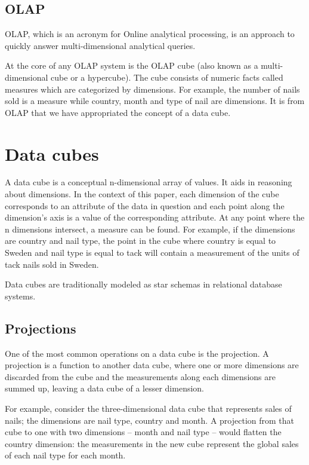 \subsection{OLAP}

OLAP, which is an acronym for Online analytical processing, is an approach to
quickly answer multi-dimensional analytical queries.

At the core of any OLAP system is the OLAP cube (also known as a
multi-dimensional cube or a hypercube). The cube consists of numeric facts
called measures which are categorized by dimensions. For example, the number
of nails sold is a measure while country, month and type of nail are
dimensions. It is from OLAP that we have appropriated the concept of a data
cube.


\section{Data cubes}

A data cube is a conceptual n-dimensional array of values. It aids in
reasoning about dimensions. In the context of this paper, each dimension of
the cube corresponds to an attribute of the data in question and each point
along the dimension's axis is a value of the corresponding attribute. At any
point where the n dimensions intersect, a measure can be found. For example,
if the dimensions are country and nail type, the point in the cube where
country is equal to Sweden and nail type is equal to tack will contain a
measurement of the units of tack nails sold in Sweden.

Data cubes are traditionally modeled as star schemas in relational database
systems. \cite{olap_solutions}


\subsection{Projections}

One of the most common operations on a data cube is the projection. A
projection is a function to another data cube, where one or more dimensions
are discarded from the cube and the measurements along each dimensions are
summed up, leaving a data cube of a lesser dimension.

For example, consider the three-dimensional data cube that represents sales of
nails; the dimensions are nail type, country and month. A projection from that
cube to one with two dimensions -- month and nail type -- would flatten the
country dimension: the measurements in the new cube represent the global sales
of each nail type for each month.


